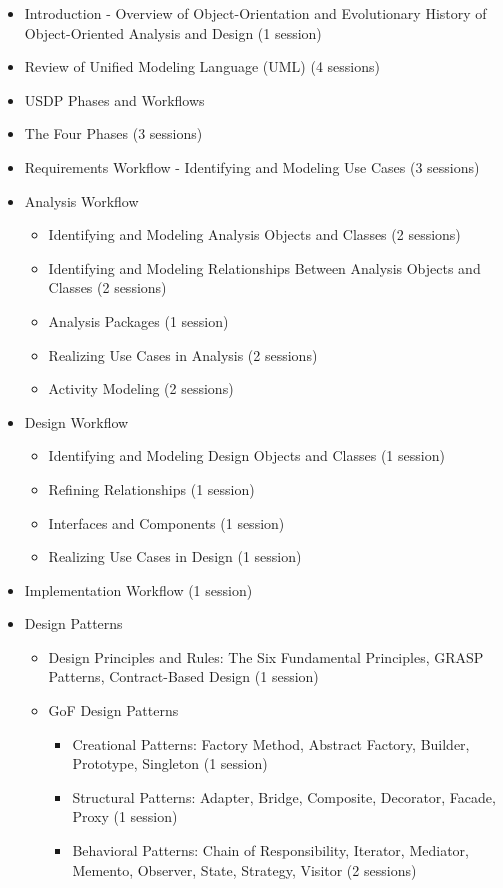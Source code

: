 \documentclass[12pt]{article}
\begin{document}
\begin{itemize}
    \item Introduction - Overview of Object-Orientation and Evolutionary History of Object-Oriented Analysis and Design (1 session)
    \item Review of Unified Modeling Language (UML) (4 sessions)
    \item USDP Phases and Workflows
    \item The Four Phases (3 sessions)
    \item Requirements Workflow - Identifying and Modeling Use Cases (3 sessions)
    \item Analysis Workflow
    \begin{itemize}
        \item Identifying and Modeling Analysis Objects and Classes (2 sessions)
        \item Identifying and Modeling Relationships Between Analysis Objects and Classes (2 sessions)
        \item Analysis Packages (1 session)
        \item Realizing Use Cases in Analysis (2 sessions)
        \item Activity Modeling (2 sessions)
    \end{itemize}
    \item Design Workflow
    \begin{itemize}
        \item Identifying and Modeling Design Objects and Classes (1 session)
        \item Refining Relationships (1 session)
        \item Interfaces and Components (1 session)
        \item Realizing Use Cases in Design (1 session)
    \end{itemize}
    \item Implementation Workflow (1 session)
    \item Design Patterns
    \begin{itemize}
        \item Design Principles and Rules: The Six Fundamental Principles, GRASP Patterns, Contract-Based Design (1 session)
        \item GoF Design Patterns
        \begin{itemize}
            \item Creational Patterns: Factory Method, Abstract Factory, Builder, Prototype, Singleton (1 session)
            \item Structural Patterns: Adapter, Bridge, Composite, Decorator, Facade, Proxy (1 session)
            \item Behavioral Patterns: Chain of Responsibility, Iterator, Mediator, Memento, Observer, State, Strategy, Visitor (2 sessions)
        \end{itemize}
    \end{itemize}
\end{itemize}
\end{document}
